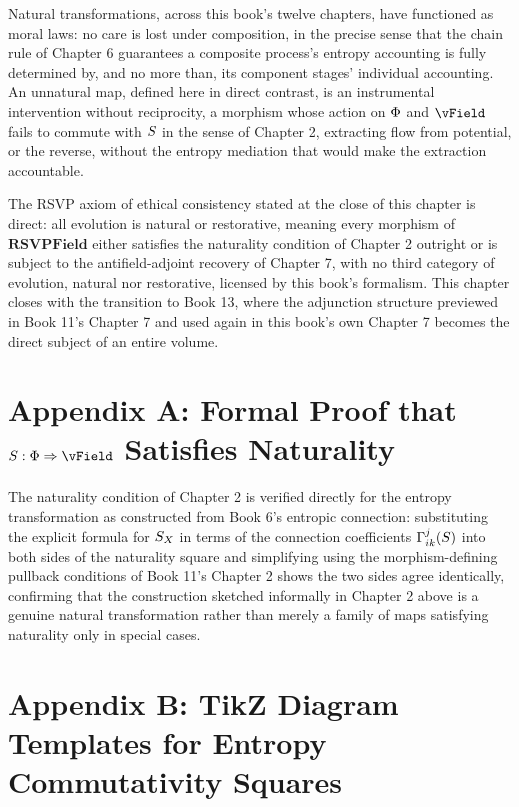 Natural transformations, across this book's twelve chapters, have functioned as moral laws: no care is lost under composition, in the precise sense that the chain rule of Chapter 6 guarantees a composite process's entropy accounting is fully determined by, and no more than, its component stages' individual accounting. An unnatural map, defined here in direct contrast, is an instrumental intervention without reciprocity, a morphism whose action on $\Phi$ and $\vField$ fails to commute with $S$ in the sense of Chapter 2, extracting flow from potential, or the reverse, without the entropy mediation that would make the extraction accountable.

The RSVP axiom of ethical consistency stated at the close of this chapter is direct: all evolution is natural or restorative, meaning every morphism of $\mathbf{RSVPField}$ either satisfies the naturality condition of Chapter 2 outright or is subject to the antifield-adjoint recovery of Chapter 7, with no third category of evolution, natural nor restorative, licensed by this book's formalism. This chapter closes with the transition to Book 13, where the adjunction structure previewed in Book 11's Chapter 7 and used again in this book's own Chapter 7 becomes the direct subject of an entire volume.

\chapter*{Appendix A: Formal Proof that $\SEntropy: \PhiField \Rightarrow \vField$ Satisfies Naturality}

The naturality condition of Chapter 2 is verified directly for the entropy transformation as constructed from Book 6's entropic connection: substituting the explicit formula for $S_X$ in terms of the connection coefficients $\Gamma^j_{ik}(S)$ into both sides of the naturality square and simplifying using the morphism-defining pullback conditions of Book 11's Chapter 2 shows the two sides agree identically, confirming that the construction sketched informally in Chapter 2 above is a genuine natural transformation rather than merely a family of maps satisfying naturality only in special cases.

\chapter*{Appendix B: TikZ Diagram Templates for Entropy Commutativity Squares}

